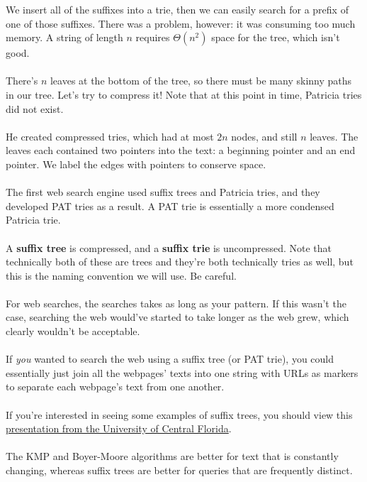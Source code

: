 \documentclass[]{article}
\theoremstyle{definition}
\begin{document}
				We insert all of the suffixes into a trie, then we can easily search for a prefix of one of those suffixes. There was a problem, however: it was consuming too much memory. A string of length $n$ requires $\Theta(n^2)$ space for the tree, which isn't good.
				\\ \\
				There's $n$ leaves at the bottom of the tree, so there must be many skinny paths in our tree. Let's try to compress it! Note that at this point in time, Patricia tries did not exist.
				\\ \\
				He created compressed tries, which had at most $2n$ nodes, and still $n$ leaves. The leaves each contained two pointers into the text: a beginning pointer and an end pointer. We label the edges with pointers to conserve space.
				\\ \\
				The first web search engine used suffix trees and Patricia tries, and they developed PAT tries as a result. A PAT trie is essentially a more condensed Patricia trie.
				\\ \\
				A \textbf{suffix tree} is compressed, and a \textbf{suffix trie} is uncompressed. Note that technically both of these are trees and they're both technically tries as well, but this is the naming convention we will use. Be careful.
				\\ \\
				For web searches, the searches takes as long as your pattern. If this wasn't the case, searching the web would've started to take longer as the web grew, which clearly wouldn't be acceptable.
				\\ \\
				If \emph{you} wanted to search the web using a suffix tree (or PAT trie), you could essentially just join all the webpages' texts into one string with URLs as markers to separate each webpage's text from one another.
				\\ \\
				If you're interested in seeing some examples of suffix trees, you should view this \href{http://www.cs.ucf.edu/~shzhang/Combio12/lec3.pdf}{presentation from the University of Central Florida}.
				\\ \\
				The KMP and Boyer-Moore algorithms are better for text that is constantly changing, whereas suffix trees are better for queries that are frequently distinct.
	
\end{document}
